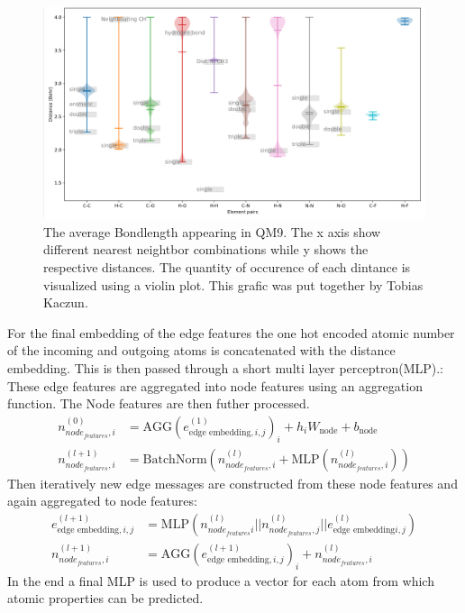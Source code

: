 \begin{figure}
    \centering
    \includegraphics[width=1.\textwidth]{chapters/foundations/images_foundation/bondlength}
    \caption{The average Bondlength appearing in QM9. The x axis show different nearest neightbor combinations while y shows the respective distances. The quantity of occurence of each dintance is visualized using a violin plot. This grafic was put together by Tobias Kaczun.}
    \label{fig:bond_length}
\end{figure}
For the final embedding of the edge features the one hot encoded atomic number of the incoming and outgoing atoms is concatenated with the distance embedding. This is then passed through a short multi layer perceptron(MLP).:
These edge features are aggregated into node features using an aggregation function. The Node features are then futher processed.
\begin{align}
    n_{node_{features},i}^{(0)} &= \text{AGG}(e_{\text{edge embedding},i,j}^{(1)})_i + h_{i}W_{\text{node}} + b_{\text{node}} \\
    n_{node_{features},i}^{(l+1)} &= \text{BatchNorm}(n_{node_{features},i}^{(l)} + \text{MLP}(n_{node_{features},i}^{(l)}))
\end{align}
Then iteratively new edge messages are constructed from these node features and again aggregated to node features:
\begin{align}
    e_{\text{edge embedding},i,j}^{(l+1)} &= \text{MLP}(n_{node_{features}i}^{(l)}||n_{node_{features},j}^{(l)}||e_{\text{edge embedding}i,j}^{(l)})\\
    n_{node_{features},i}^{(l+1)} &= \text{AGG}(e_{\text{edge embedding},i,j}^{(l+1)})_i + n_{node_{features},i}^{(l)}
\end{align}
In the end a final MLP is used to produce a vector for each atom from which atomic properties can be predicted.

